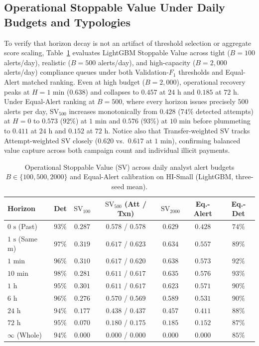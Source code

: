 \documentclass[pdflatex,sn-mathphys,Numbered]{sn-jnl}
\theoremstyle{thmstyleone}
\begin{document}
\subsection{Operational Stoppable Value Under Daily Budgets and Typologies}\label{sec:budgets_typologies}

To verify that horizon decay is not an artifact of threshold selection or aggregate score scaling, Table~\ref{tab:sv_budgets} evaluates LightGBM Stoppable Value across tight ($B = 100$ alerts/day), realistic ($B = 500$ alerts/day), and high-capacity ($B = 2{,}000$ alerts/day) compliance queues under both Validation-$F_1$ thresholds and Equal-Alert matched ranking. Even at high budget ($B = 2{,}000$), operational recovery peaks at $H = 1\text{ min}$ ($0.638$) and collapses to $0.457$ at $24\text{ h}$ and $0.185$ at $72\text{ h}$. Under Equal-Alert ranking at $B = 500$, where every horizon issues precisely $500$ alerts per day, $\text{SV}_{500}$ increases monotonically from $0.428$ ($74\%$ detected attempts) at $H = 0$ to $0.573$ ($92\%$) at $1\text{ min}$ and $0.576$ ($93\%$) at $10\text{ min}$ before plummeting to $0.411$ at $24\text{ h}$ and $0.152$ at $72\text{ h}$. Notice also that Transfer-weighted SV tracks Attempt-weighted SV closely ($0.620$ vs.\ $0.617$ at $1\text{ min}$), confirming balanced value capture across both campaign count and individual illicit payments.

\begin{table}[t]
\centering
\caption{Operational Stoppable Value (SV) across daily analyst alert budgets $B \in \{100, 500, 2000\}$ and Equal-Alert calibration on HI-Small (LightGBM, three-seed mean).}
\label{tab:sv_budgets}
\scriptsize
\setlength{\tabcolsep}{2.5pt}
\begin{tabular}{@{}lcccccc@{}}
\toprule
\textbf{Horizon} & \textbf{Det} & \textbf{$\text{SV}_{100}$} & \textbf{$\text{SV}_{500}$ (Att / Txn)} & \textbf{$\text{SV}_{2000}$} & \textbf{Eq.-Alert} & \textbf{Eq.-Det} \\
\midrule
$0\text{ s}$ (Past) & $93\%$ & $0.287$ & $0.578$ / $0.578$ & $0.629$ & $0.428$ & $74\%$ \\
$1\text{ s}$ (Same m) & $97\%$ & $0.319$ & $0.617$ / $0.623$ & $0.634$ & $0.557$ & $89\%$ \\
$1\text{ min}$ & $96\%$ & $0.310$ & $0.617$ / $0.620$ & $0.638$ & $0.573$ & $92\%$ \\
$10\text{ min}$ & $98\%$ & $0.281$ & $0.611$ / $0.617$ & $0.635$ & $0.576$ & $93\%$ \\
$1\text{ h}$ & $95\%$ & $0.301$ & $0.611$ / $0.617$ & $0.623$ & $0.571$ & $90\%$ \\
$6\text{ h}$ & $96\%$ & $0.276$ & $0.570$ / $0.569$ & $0.589$ & $0.531$ & $90\%$ \\
$24\text{ h}$ & $94\%$ & $0.177$ & $0.438$ / $0.437$ & $0.457$ & $0.411$ & $88\%$ \\
$72\text{ h}$ & $95\%$ & $0.070$ & $0.180$ / $0.175$ & $0.185$ & $0.152$ & $87\%$ \\
$\infty$ (Whole) & $94\%$ & $0.000$ & $0.000$ / $0.000$ & $0.000$ & $0.000$ & $85\%$ \\
\bottomrule
\end{tabular}
\end{table}
\end{document}
